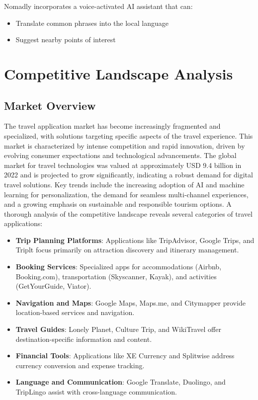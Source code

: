 \documentclass[11pt, a4paper]{article}
\begin{document}
Nomadly incorporates a voice-activated AI assistant that can:
\begin{itemize}
    \item Translate common phrases into the local language
    \item Suggest nearby points of interest
\end{itemize}

\section{Competitive Landscape Analysis}

\subsection{Market Overview}

The travel application market has become increasingly fragmented and specialized, with solutions targeting specific aspects of the travel experience. This market is characterized by intense competition and rapid innovation, driven by evolving consumer expectations and technological advancements. The global market for travel technologies was valued at approximately USD 9.4 billion in 2022 and is projected to grow significantly, indicating a robust demand for digital travel solutions. Key trends include the increasing adoption of AI and machine learning for personalization, the demand for seamless multi-channel experiences, and a growing emphasis on sustainable and responsible tourism options. A thorough analysis of the competitive landscape reveals several categories of travel applications:

\begin{itemize}
    \item \textbf{Trip Planning Platforms}: Applications like TripAdvisor, Google Trips, and Triplt focus primarily on attraction discovery and itinerary management.
    \item \textbf{Booking Services}: Specialized apps for accommodations (Airbnb, Booking.com), transportation (Skyscanner, Kayak), and activities (GetYourGuide, Viator).
    \item \textbf{Navigation and Maps}: Google Maps, Maps.me, and Citymapper provide location-based services and navigation.
    \item \textbf{Travel Guides}: Lonely Planet, Culture Trip, and WikiTravel offer destination-specific information and content.
    \item \textbf{Financial Tools}: Applications like XE Currency and Splitwise address currency conversion and expense tracking.
    \item \textbf{Language and Communication}: Google Translate, Duolingo, and TripLingo assist with cross-language communication.
\end{itemize}
\end{document}
